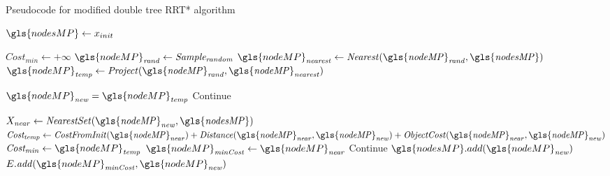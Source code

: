 \newpage
\begin{algorithm}[H]
\caption{Pseudocode for modified double tree \ac{RRT*} algorithm}%
\label{pseudocode:proposed_rrt_star}
\begin{algorithmic}[1]

\hspace{-0.9cm}\colorbox{my_grey}{\parbox{\linewidth}{%
\State $\gls{nodesMP} \leftarrow x_{init}$

\hspace{-0.1cm}\colorbox{my_light_blue}{\parbox{\linewidth}{%
    \State $Cost_\mathit{min} \leftarrow +\infty$ 
    \State $\gls{nodeMP}_\mathit{rand} \leftarrow \mathit{Sample_{random}}$
    \State $\gls{nodeMP}_\mathit{nearest} \leftarrow \mathit{Nearest(\gls{nodeMP}_{rand}, \gls{nodesMP})}$
    \State $\gls{nodeMP}_\mathit{temp} \leftarrow \mathit{Project(\gls{nodeMP}_{rand}, \gls{nodeMP}_{nearest})}$

    \State $\gls{nodeMP}_\mathit{new} = \gls{nodeMP}_\mathit{temp}$
    \Else
        \State Continue
    \EndIf
}}

\hspace{-0.1cm}\colorbox{my_yellow}{\parbox{\linewidth}{%
    \State $X_\mathit{near} \leftarrow \mathit{NearestSet(\gls{nodeMP}_{new}, \gls{nodesMP})}$ 
    \State $\mathit{Cost_{temp}} \leftarrow \mathit{CostFromInit(\gls{nodeMP}_{near}) + Distance(\gls{nodeMP}_{near}, \gls{nodeMP}_{new}) + ObjectCost(\gls{nodeMP}_{near}, \gls{nodeMP}_{new})}$
    \State $\mathit{Cost_{min}} \leftarrow \gls{nodeMP}_\mathit{temp}$
    \State $\gls{nodeMP}_\mathit{minCost} \leftarrow \gls{nodeMP}_\mathit{near}$
            \EndIf
        \EndIf
    \EndFor
        \State Continue
    \Else
    \State $\gls{nodesMP}.add(\gls{nodeMP}_\mathit{new})$
    \State $E.\mathit{add}(\gls{nodeMP}_\mathit{minCost}, \gls{nodeMP}_\mathit{new})$
    \EndIf
}}

}}
\end{algorithmic}
\end{algorithm}
